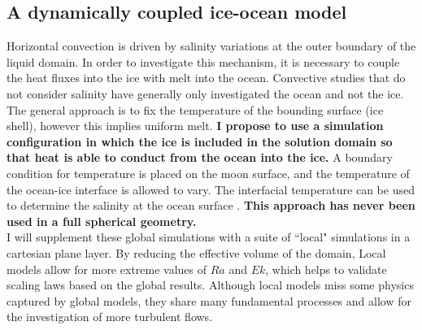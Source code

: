 \documentclass[12pt]{article}
\begin{document}
\subsection{A dynamically coupled ice-ocean model}

Horizontal convection is driven by salinity variations at the outer boundary of the liquid domain. In order to investigate this mechanism, it is necessary to couple the heat fluxes into the ice with melt into the ocean. 
Convective studies that do not consider salinity have generally only investigated the ocean \citep{kS19,dL23} and not the ice. The general approach is to fix the temperature of the bounding surface (ice shell), however this implies uniform melt.
\textbf{I propose to use a simulation configuration in which the ice is included in the solution domain so that heat is able to conduct from the ocean into the ice.} 
A boundary condition for temperature is placed on the moon surface, and the temperature of the ocean-ice interface is allowed to vary. The interfacial temperature can be used to determine the salinity at the ocean surface \citep{wK22}.
\textbf{This approach has never been used in a full spherical geometry.}\\

I will supplement these global simulations with a suite of ``local" simulations in a cartesian plane layer. By reducing the effective volume of the domain, Local models allow for more extreme values of $Ra$ and $Ek$, which helps to validate scaling laws based on the global results. Although local models miss some physics captured by global models, they share many fundamental processes and allow for the investigation of more turbulent flows.
\end{document}
